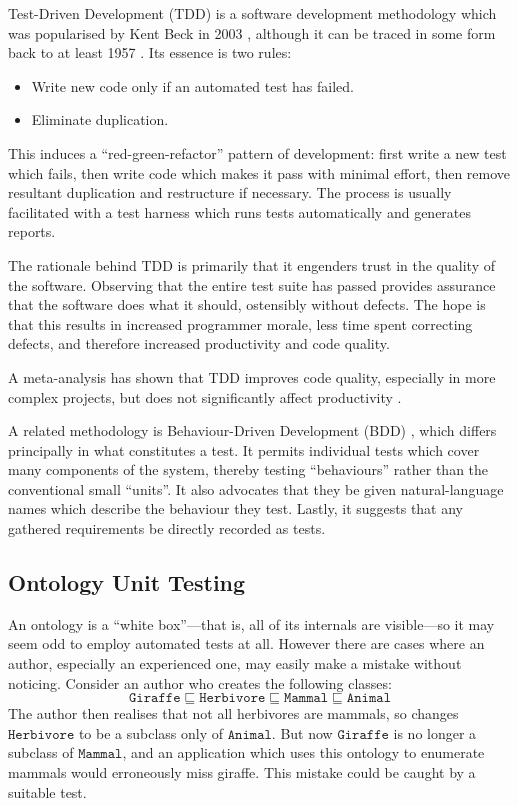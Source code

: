 \documentclass{sig-alternate}
\newcommand{\oclass}[1]{\ensuremath{\mathtt{#1}}}
\newcommand{\osub}{\sqsubseteq}
\begin{document}
Test-Driven Development (TDD) is a software development methodology which was popularised by Kent Beck in 2003 \cite{Beck:TDD}, although it can be traced in some form back to at least 1957 \cite[p.~159--160]{McCracken:Programming}.  Its essence is two rules:
\begin{itemize}[nosep]
  \item Write new code only if an automated test has failed.
  \item Eliminate duplication.
\end{itemize}
This induces a ``red-green-refactor'' pattern of development: first write a new test which fails, then write code which makes it pass with minimal effort, then remove resultant duplication and restructure if necessary.  The process is usually facilitated with a test harness which runs tests automatically and generates reports.

The rationale behind TDD is primarily that it engenders trust in the quality of the software.  Observing that the entire test suite has passed provides assurance that the software does what it should, ostensibly without defects.  The hope is that this results in increased programmer morale, less time spent correcting defects, and therefore increased productivity and code quality.

A meta-analysis has shown that TDD improves code quality, especially in more complex projects, but does not significantly affect productivity \cite{Rafique:TDD}.

A related methodology is Behaviour-Driven Development (BDD) \cite{Chelimsky:RSpec}, which differs principally in what constitutes a test.  It permits individual tests which cover many components of the system, thereby testing ``behaviours'' rather than the conventional small ``units''.  It also advocates that they be given natural-language names which describe the behaviour they test.  Lastly, it suggests that any gathered requirements be directly recorded as tests.

\subsection{Ontology Unit Testing}

An ontology is a ``white box''---that is, all of its internals are visible---so it may seem odd to employ automated tests at all.  However there are cases where an author, especially an experienced one, may easily make a mistake without noticing.  Consider an author who creates the following classes:
\[ \oclass{Giraffe} \osub \oclass{Herbivore} \osub \oclass{Mammal} \osub \oclass{Animal} \]
The author then realises that not all herbivores are mammals, so changes \oclass{Herbivore} to be a subclass only of \oclass{Animal}.  But now \oclass{Giraffe} is no longer a subclass of \oclass{Mammal}, and an application which uses this ontology to enumerate mammals would erroneously miss giraffe.  This mistake could be caught by a suitable test.
\end{document}
